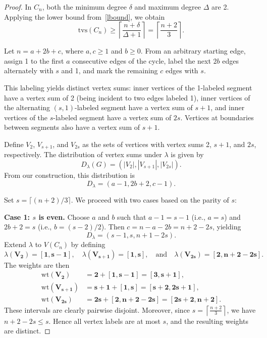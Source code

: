 \documentclass[11pt]{article}
\numberwithin{equation}{section}
\begin{document}
\begin{proof}
In \(C_n\), both the minimum degree \(\delta\) and maximum degree \(\Delta\) are 2. Applying the lower bound from~\eqref{lbound}, we obtain
\[
\mathrm{tvs}(C_n) \geq \left\lceil \frac{n + \delta}{\Delta + 1} \right\rceil = \left\lceil \frac{n + 2}{3} \right\rceil.
\]

Let \(n = a + 2b + c\), where \(a,c \geq 1\) and \(b \geq 0\). From an arbitrary starting edge, assign 1 to the first \(a\) consecutive edges of the cycle, label the next \(2b\) edges alternately with \(s\) and 1, and mark the remaining \(c\) edges with \(s\). 

This labeling yields distinct vertex sums: inner vertices of the 1-labeled segment have a vertex sum of 2 (being incident to two edges labeled 1), inner vertices of the alternating \((s,1)\)-labeled segment have a vertex sum of \(s + 1\), and inner vertices of the \(s\)-labeled segment have a vertex sum of \(2s\). Vertices at boundaries between segments also have a vertex sum of \(s + 1\).

Define \(V_2\), \(V_{s+1}\), and \(V_{2s}\) as the sets of vertices with vertex sums 2, \(s + 1\), and \(2s\), respectively. The distribution of vertex sums under \(\lambda\) is given by
\[
D_{\lambda}(G) = \left(|V_2|, |V_{s+1}|, |V_{2s}|\right).
\]
From our construction, this distribution is
\begin{equation}\label{distribution}
D_{\lambda} = (a - 1, 2b + 2, c - 1).
\end{equation}

Set \(s = \lceil (n + 2) / 3 \rceil\). We proceed with two cases based on the parity of \(s\):

\textbf{Case 1: \(s\) is even.} Choose \(a\) and \(b\) such that \(a - 1 = s - 1\) (i.e., \(a = s\)) and \(2b + 2 = s\) (i.e., \(b = (s - 2)/2\)). Then \(c = n - a - 2b = n + 2 - 2s\), yielding
\[
D_{\lambda} = (s - 1, s, n + 1 - 2s).
\]
Extend \(\lambda\) to \(V(C_n)\) by defining
\begin{equation}\label{s_even}
\lambda(\mathbf{V_2}) = \mathbf{[1,s-1]}, \quad \lambda(\mathbf{V_{s+1}}) = \mathbf{[1,s]}, \quad \text{and} \quad \lambda(\mathbf{V_{2s}}) = \mathbf{[2, n + 2 - 2s]}.
\end{equation}
The weights are then
\begin{align*}
\mathrm{wt}(\mathbf{V_2}) &= \mathbf{2} + \mathbf{[1,s-1]} = \mathbf{[3,s+1]}, \\
\mathrm{wt}(\mathbf{V_{s+1}}) &= \mathbf{s + 1} + \mathbf{[1,s]} = \mathbf{[s+2,2s+1]}, \\
\mathrm{wt}(\mathbf{V_{2s}}) &= \mathbf{2s} + \mathbf{[2,n+2-2s]} = \mathbf{[2s+2,n+2]}.
\end{align*}
These intervals are clearly pairwise disjoint. Moreover, since \(s=\left\lceil\frac{n+2}{3}\right\rceil\), we have \(n+2-2s\le s\). Hence all vertex labels are at most \(s\), and the resulting weights are distinct.


\end{proof}
\end{document}
